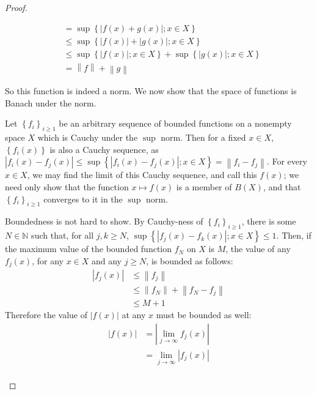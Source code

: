 \documentclass[12pt]{article}
\newcommand{\N}{\mathbb{N}}
\theoremstyle{definition}
\begin{document}
\begin{proof}
\begin{enumerate}[label=(\roman*)]
\begin{itemize}
\begin{align*}
						&= \sup\left\{ \left \lvert { f(x) + g(x) } \right \lvert ; x\in X \right\}\\
						&\leq \sup\left\{ \left \lvert { f(x) } \right \lvert +\left \lvert { g(x) } \right \lvert ;x \in X \right\}\\
						&\leq \sup\left\{ \left \lvert { f(x) } \right \lvert ;x \in X \right\} + \sup\left\{ \left \lvert { g(x) } \right \lvert ; x \in X \right\}\\
						&= \left \lVert { f } \right \lVert  + \left \lVert { g } \right \lVert 
					\end{align*}
			\end{itemize}
			So this function is indeed a norm. We now show that the space of functions is Banach under the norm. 
			\par Let $\left\{ f_i \right\}_{i \geq 1}$ be an arbitrary sequence of bounded functions on a nonempty space $X$ which is Cauchy under the $\sup$ norm. Then for a fixed $x\in X$, $\left\{ f_i(x) \right\}$ is also a Cauchy sequence, as $\left \lvert { f_i(x) - f_j(x) } \right \lvert \leq \sup\left\{\left \lvert { f_i(x) - f_j(x) } \right \lvert ; x \in X \right\} = \left \lVert { f_i - f_j } \right \lVert $. For every $x \in X$, we may find the limit of this Cauchy sequence, and call this $f(x)$; we need only show that the function $x \mapsto f(x)$ is a member of $B(X)$, and that $\left\{ f_i \right\}_{i \geq 1}$ converges to it in the $\sup$ norm.
			\par Boundedness is not hard to show. By Cauchy-ness of $\left\{ f_i \right\}_{i\geq 1}$, there is some $N \in \N$ such that, for all $j,k \geq N$, $\sup\left\{ \left \lvert { f_j(x) - f_k(x) } \right \lvert ; x \in X \right\} \leq 1$. Then, if the maximum value of the bounded function $f_N$ on $X$ is $M$, the value of any $f_j(x)$, for any $x \in X$ and any $j \geq N$, is bounded as follows:
			\begin{align*}
				\left \lvert { f_j(x) } \right \lvert  &\leq \left \lVert { f_j } \right \lVert \\
				&\leq \left \lVert { f_N } \right \lVert + \left \lVert { f_N - f_j } \right \lVert \\
				&\leq M + 1
			\end{align*}
			Therefore the value of $\left \lvert { f(x) } \right \lvert $ at any $x$ must be bounded as well:
			\begin{align*}
				\left \lvert { f(x) } \right \lvert &= \left \lvert { \lim_{j \to \infty} f_j(x) } \right \lvert \\
				&= \lim_{j\to \infty}\left \lvert { f_j(x) } \right \lvert \\

\end{align*}
\end{enumerate}
\end{proof}
\end{document}
